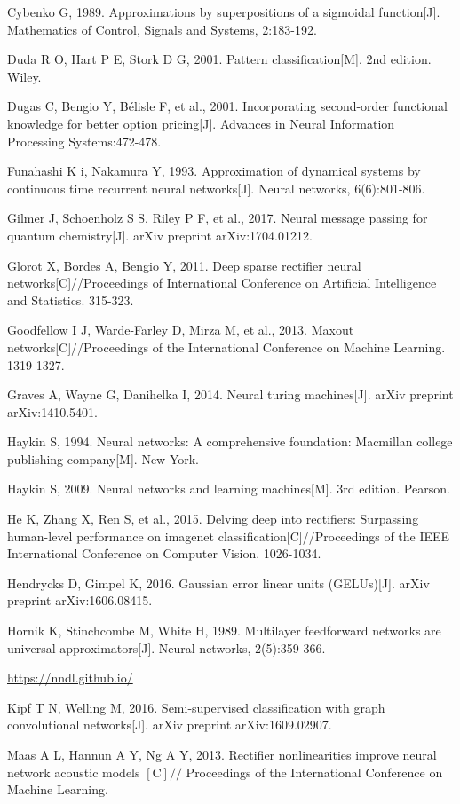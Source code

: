 \documentclass[10pt]{article}
\begin{document}
Cybenko G, 1989. Approximations by superpositions of a sigmoidal function[J]. Mathematics of Control, Signals and Systems, 2:183-192.

Duda R O, Hart P E, Stork D G, 2001. Pattern classification[M]. 2nd edition. Wiley.

Dugas C, Bengio Y, Bélisle F, et al., 2001. Incorporating second-order functional knowledge for better option pricing[J]. Advances in Neural Information Processing Systems:472-478.

Funahashi K i, Nakamura Y, 1993. Approximation of dynamical systems by continuous time recurrent neural networks[J]. Neural networks, 6(6):801-806.

Gilmer J, Schoenholz S S, Riley P F, et al., 2017. Neural message passing for quantum chemistry[J]. arXiv preprint arXiv:1704.01212.

Glorot X, Bordes A, Bengio Y, 2011. Deep sparse rectifier neural networks[C]//Proceedings of International Conference on Artificial Intelligence and Statistics. 315-323.

Goodfellow I J, Warde-Farley D, Mirza M, et al., 2013. Maxout networks[C]//Proceedings of the International Conference on Machine Learning. 1319-1327.

Graves A, Wayne G, Danihelka I, 2014. Neural turing machines[J]. arXiv preprint arXiv:1410.5401.

Haykin S, 1994. Neural networks: A comprehensive foundation: Macmillan college publishing company[M]. New York.

Haykin S, 2009. Neural networks and learning machines[M]. 3rd edition. Pearson.

He K, Zhang X, Ren S, et al., 2015. Delving deep into rectifiers: Surpassing human-level performance on imagenet classification[C]//Proceedings of the IEEE International Conference on Computer Vision. 1026-1034.

Hendrycks D, Gimpel K, 2016. Gaussian error linear units (GELUs)[J]. arXiv preprint arXiv:1606.08415.

Hornik K, Stinchcombe M, White H, 1989. Multilayer feedforward networks are universal approximators[J]. Neural networks, 2(5):359-366.

\href{https://nndl.github.io/}{https://nndl.github.io/}

Kipf T N, Welling M, 2016. Semi-supervised classification with graph convolutional networks[J]. arXiv preprint arXiv:1609.02907.

Maas A L, Hannun A Y, Ng A Y, 2013. Rectifier nonlinearities improve neural network acoustic models $[\mathrm{C}] / /$ Proceedings of the International Conference on Machine Learning.
\end{document}

